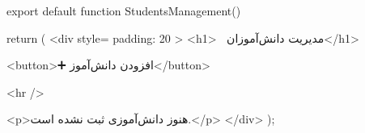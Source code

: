 export default function StudentsManagement() {
  return (
    <div style={{ padding: 20 }}>
      <h1>👨‍🎓 مدیریت دانش‌آموزان</h1>

      <button>➕ افزودن دانش‌آموز</button>

      <hr />

      <p>هنوز دانش‌آموزی ثبت نشده است.</p>
    </div>
  );
}